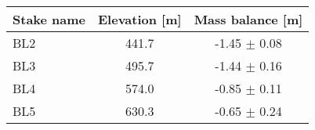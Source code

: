 \begin{tabular}{lcc}
\toprule
Stake name & Elevation [m] &  Mass balance [m] \\
\midrule
       BL2 &         441.7 &  -1.45 $\pm$ 0.08 \\
       BL3 &         495.7 &  -1.44 $\pm$ 0.16 \\
       BL4 &         574.0 &  -0.85 $\pm$ 0.11 \\
       BL5 &         630.3 &  -0.65 $\pm$ 0.24 \\
\bottomrule
\end{tabular}
